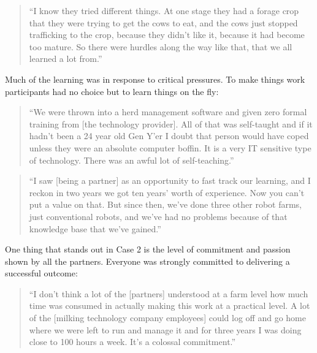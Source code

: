 \begin{quote}
\small
\enquote{I know they tried different things. At one stage they had a forage crop that they were trying to get the cows to eat, and the cows just stopped trafficking to the crop, because they didn't like it, because it had become too mature. So there were hurdles along the way like that, that we all learned a lot from.} \\
\end{quote}

Much of the learning was in response to critical pressures. To make things work participants had no choice but to learn things on the fly:

\begin{quote}
\small
\enquote{We were thrown into a herd management software and given zero formal training from [the technology provider]. All of that was self-taught and if it hadn't been a 24 year old Gen Y'er I doubt that person would have coped unless they were an absolute computer boffin. It is a very IT sensitive type of technology. There was an awful lot of self-teaching.} \\
\end{quote}

\begin{quote}
\small
\enquote{I saw [being a partner] as an opportunity to fast track our learning, and I reckon in two years we got ten years' worth of experience. Now you can't put a value on that. But since then, we've done three other robot farms, just conventional robots, and we've had no problems because of that knowledge base that we've gained.} \\
\end{quote}

One thing that stands out in Case 2 is the level of commitment and passion shown by all the partners. Everyone was strongly committed to delivering a successful outcome:

\begin{quote}
\small
\enquote{I don't think a lot of the [partners] understood at a farm level how much time was consumed in actually making this work at a practical level. A lot of the [milking technology company employees] could log off and go home where we were left to run and manage it and for three years I was doing close to 100 hours a week. It's a colossal commitment.} \\
\end{quote}

